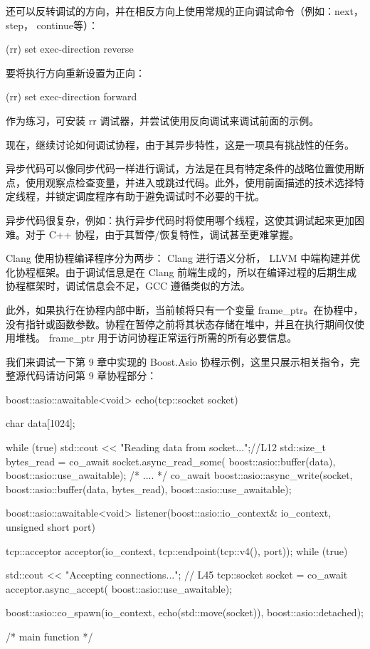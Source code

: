 还可以反转调试的方向，并在相反方向上使用常规的正向调试命令（例如：next， step， continue等）：

\begin{shell}
(rr) set exec-direction reverse
\end{shell}

要将执行方向重新设置为正向：

\begin{shell}
(rr) set exec-direction forward
\end{shell}

作为练习，可安装 rr 调试器，并尝试使用反向调试来调试前面的示例。

现在，继续讨论如何调试协程，由于其异步特性，这是一项具有挑战性的任务。


异步代码可以像同步代码一样进行调试，方法是在具有特定条件的战略位置使用断点，使用观察点检查变量，并进入或跳过代码。此外，使用前面描述的技术选择特定线程，并锁定调度程序有助于避免调试时不必要的干扰。

异步代码很复杂，例如：执行异步代码时将使用哪个线程，这使其调试起来更加困难。对于 C++ 协程，由于其暂停/恢复特性，调试甚至更难掌握。

Clang 使用协程编译程序分为两步： Clang 进行语义分析， LLVM 中端构建并优化协程框架。由于调试信息是在 Clang 前端生成的，所以在编译过程的后期生成协程框架时，调试信息会不足，GCC 遵循类似的方法。

此外，如果执行在协程内部中断，当前帧将只有一个变量 frame\_ptr。在协程中，没有指针或函数参数。协程在暂停之前将其状态存储在堆中，并且在执行期间仅使用堆栈。 frame\_ptr 用于访问协程正常运行所需的所有必要信息。

我们来调试一下第 9 章中实现的 Boost.Asio 协程示例，这里只展示相关指令，完整源代码请访问第 9 章协程部分：

\begin{cpp}
boost::asio::awaitable<void> echo(tcp::socket socket) {
    char data[1024];

    while (true) {
        std::cout << "Reading data from socket...\n";//L12
        std::size_t bytes_read = co_await
            socket.async_read_some(
                boost::asio::buffer(data),
                             boost::asio::use_awaitable);
        /* .... */
        co_await boost::asio::async_write(socket,
                boost::asio::buffer(data, bytes_read),
                boost::asio::use_awaitable);
    }
}

boost::asio::awaitable<void>
listener(boost::asio::io_context& io_context,
         unsigned short port) {
    tcp::acceptor acceptor(io_context,
                           tcp::endpoint(tcp::v4(), port));
    while (true) {
        std::cout << "Accepting connections...\n"; // L45
        tcp::socket socket = co_await
            acceptor.async_accept(
                boost::asio::use_awaitable);

        boost::asio::co_spawn(io_context,
            echo(std::move(socket)),
            boost::asio::detached);
    }
}
/* main function */
\end{cpp}

